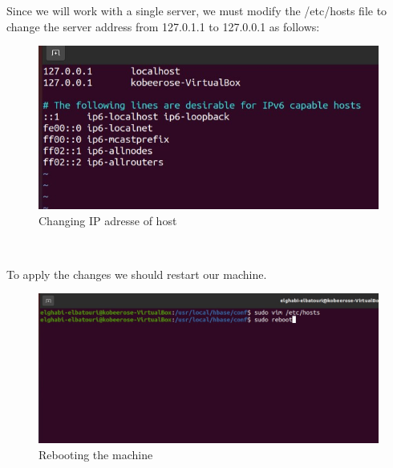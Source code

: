 \begin{spacing}{1.2}
\par Since we will work with a single server, we must modify the /etc/hosts file to change the server address from 127.0.1.1 to 127.0.0.1 as follows:
\\
\begin{figure}[!htb] 
\begin{center} 
\includegraphics[width=1\linewidth]{Pictures/HBase/Configuring Hbase in Standalone & Pseudo-distributed mode/Installing and Configuring Apache Hbase/Changing IP adresse of host} 
\end{center} 
\caption{Changing IP adresse of host} 
\end{figure}  \FloatBarrier
\\

\par To apply the changes we should restart our machine.
\\
\begin{figure}[!htb] 
\begin{center} 
\includegraphics[width=1\linewidth]{Pictures/HBase/Configuring Hbase in Standalone & Pseudo-distributed mode/Installing and Configuring Apache Hbase/rebooting the machine} 
\end{center} 
\caption{Rebooting the machine} 
\end{figure}  \FloatBarrier
\\


\end{spacing}
